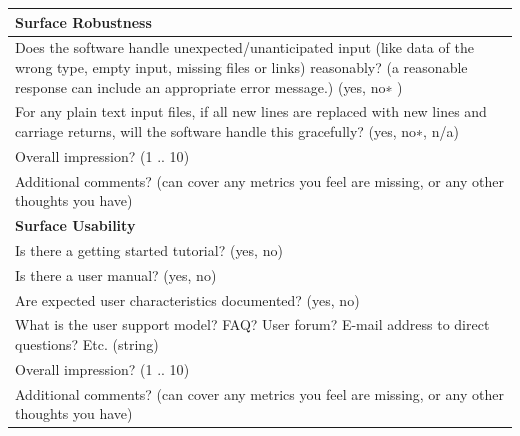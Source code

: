 \documentclass[12pt, notitlepage]{article}
\begin{document}
\begin{appendices}
\begin{singlespace}
\def\arraystretch{1.4}
\begin{tabular}{p{14cm}}
	\hline		
	\textbf{Surface Robustness}\\
	\hline
	Does the software handle unexpected/unanticipated input (like data of the wrong type, empty input, missing files or links) reasonably? (a reasonable response can include an appropriate error message.) ({yes, no∗ })\\
	For any plain text input files, if all new lines are replaced with new lines and carriage returns, will the software handle this gracefully? ({yes, no∗, n/a})\\
	Overall impression? ({1 .. 10})\\
	Additional comments? (can cover any metrics you feel are missing, or any other thoughts you have)\\
	\hline		
	\textbf{Surface Usability}\\
	\hline
	Is there a getting started tutorial? ({yes, no})\\
	Is there a user manual? ({yes, no})\\
	Are expected user characteristics documented? ({yes, no})\\
	What is the user support model? FAQ? User forum? E-mail address to direct questions? Etc. (string)\\
	Overall impression? ({1 .. 10})\\
	Additional comments? (can cover any metrics you feel are missing, or any other thoughts you have)\\
	\hline
\end{tabular}


\end{singlespace}
\end{appendices}
\end{document}
